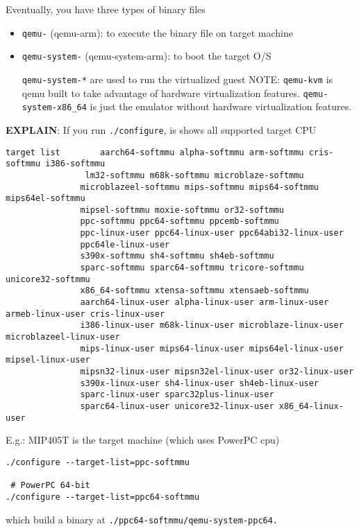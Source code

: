 Eventually, you have three types of binary files
\begin{itemize}
  \item \verb!qemu-! (qemu-arm): to execute the binary file on target machine
  
  \item \verb!qemu-system-! (qemu-system-arm): to boot the target O/S

\verb!qemu-system-*! are used to run the virtualized guest
NOTE: \verb!qemu-kvm! is qemu built to take advantage of hardware virtualization
features. \verb!qemu-system-x86_64! is just the emulator without hardware
virtualization features.

\end{itemize}

{\bf EXPLAIN}: If you run \verb!./configure!, is shows all supported target CPU
{\footnotesize
\begin{verbatim}
target list        aarch64-softmmu alpha-softmmu arm-softmmu cris-softmmu i386-softmmu 
                lm32-softmmu m68k-softmmu microblaze-softmmu
               microblazeel-softmmu mips-softmmu mips64-softmmu mips64el-softmmu 
               mipsel-softmmu moxie-softmmu or32-softmmu 
               ppc-softmmu ppc64-softmmu ppcemb-softmmu 
               ppc-linux-user ppc64-linux-user ppc64abi32-linux-user
               ppc64le-linux-user
               s390x-softmmu sh4-softmmu sh4eb-softmmu 
               sparc-softmmu sparc64-softmmu tricore-softmmu unicore32-softmmu 
               x86_64-softmmu xtensa-softmmu xtensaeb-softmmu 
               aarch64-linux-user alpha-linux-user arm-linux-user armeb-linux-user cris-linux-user 
               i386-linux-user m68k-linux-user microblaze-linux-user microblazeel-linux-user 
               mips-linux-user mips64-linux-user mips64el-linux-user mipsel-linux-user 
               mipsn32-linux-user mipsn32el-linux-user or32-linux-user  
               s390x-linux-user sh4-linux-user sh4eb-linux-user 
               sparc-linux-user sparc32plus-linux-user 
               sparc64-linux-user unicore32-linux-user x86_64-linux-user
\end{verbatim}
}
  
E.g.: MIP405T is the target machine (which uses PowerPC cpu)
\begin{verbatim}
./configure --target-list=ppc-softmmu

 # PowerPC 64-bit
./configure --target-list=ppc64-softmmu
\end{verbatim}
which build a binary at \verb!./ppc64-softmmu/qemu-system-ppc64.!

